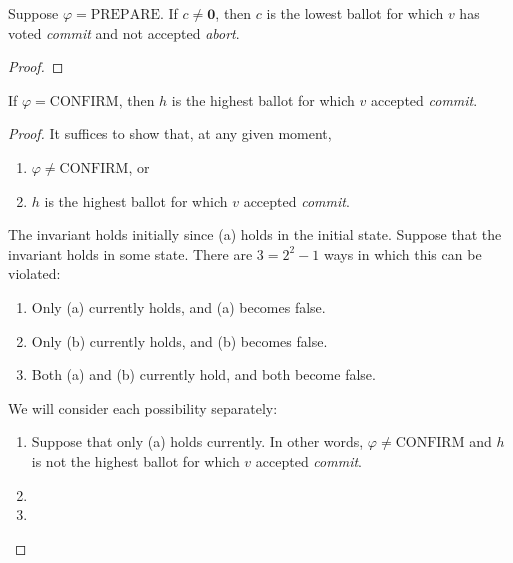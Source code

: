 \begin{thm}
    Suppose $\varphi = \text{PREPARE}$.
    If $c \ne \textbf{0}$, then $c$ is the lowest ballot for which $v$ has voted \textit{commit} and not accepted \textit{abort}.
\end{thm}

\begin{proof}
\end{proof}


\begin{thm}
    If $\varphi = \text{CONFIRM}$, then $h$ is the highest ballot for which $v$ accepted \textit{commit}.
\end{thm}

\begin{proof}
    It suffices to show that, at any given moment,
    \begin{enumerate}[label=(\alph*)]
        \item %
            $\varphi \ne \text{CONFIRM}$, or
        \item %
            $h$ is the highest ballot for which $v$ accepted \textit{commit}.
    \end{enumerate}
    The invariant holds initially since (a) holds in the initial state.
    Suppose that the invariant holds in some state.
    There are $3 = 2^2 - 1$ ways in which this can be violated:
    \begin{enumerate}[label=(\roman*)]
        \item  %
            Only (a) currently holds, and (a) becomes false.
        \item  %
            Only (b) currently holds, and (b) becomes false.
        \item  %
            Both (a) and (b) currently hold, and both become false.
    \end{enumerate}
    We will consider each possibility separately:
    \begin{enumerate}[label=(\roman*)]
        \item  %
            Suppose that only (a) holds currently.
            In other words, $\varphi \ne \text{CONFIRM}$ and $h$ is not the highest ballot for which $v$ accepted \textit{commit}.
        \item  %
        \item  %
    \end{enumerate}
\end{proof}

